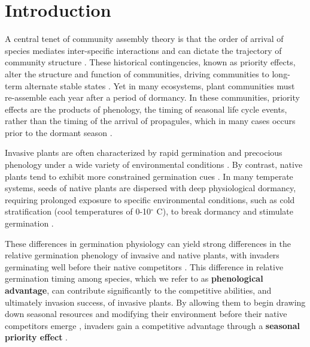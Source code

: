 \documentclass{article}[11pt]
\begin{document}
\section*{Introduction}
 A central tenet of community assembly theory is that the order of arrival of species mediates inter-specific interactions and can dictate the trajectory of community structure \citep{Fukami2015}. These historical contingencies, known as priority effects, alter the structure and function of communities, driving communities to long-term alternate stable states \citep{Fukami2011}. Yet in many ecosystems, plant communities must re-assemble each year after a period of dormancy. In these communities, priority effects are the products of phenology, the timing of seasonal life cycle events, %
rather than the timing of the arrival of propagules, which in many cases occurs prior to the dormant season \citep{Rudolf:2019aa,Howe:1982aa,Baskin:1988aa}. 

Invasive plants are often characterized by rapid germination and precocious phenology under a wide variety of environmental conditions \citep{Gioria2018,Gioria:2017wo,Wolkovich:2011uh,Smith:2013uj}. By contrast, native plants tend to exhibit more constrained germination cues \citep{Marushia:2010ug,Wainwright:2013tv,Van-Clef:2001to}. In many temperate systems, seeds of native plants are dispersed with deep physiological dormancy, requiring prolonged exposure to specific environmental conditions, such as cold stratification (cool temperatures of 0-10$^{\circ}$ C), to break dormancy and stimulate germination \citep{Brink:2013wr,Cavieres:2017aa,Bradford:2007tj}.

These differences in germination physiology can yield strong differences in the relative germination phenology of invasive and native plants, with invaders germinating well before their native competitors \citep{Gioria:2017wo}. This difference in relative germination timing among species, which we refer to as \textbf{phenological advantage}, can contribute significantly to the competitive abilities, and ultimately invasion success, of invasive plants. By allowing them to begin drawing down seasonal resources and modifying their environment before their native competitors emerge \citep{Kardol2013}, invaders gain a competitive advantage through a \textbf{seasonal priority effect} \citep{Wainwright_2011}.
\end{document}
